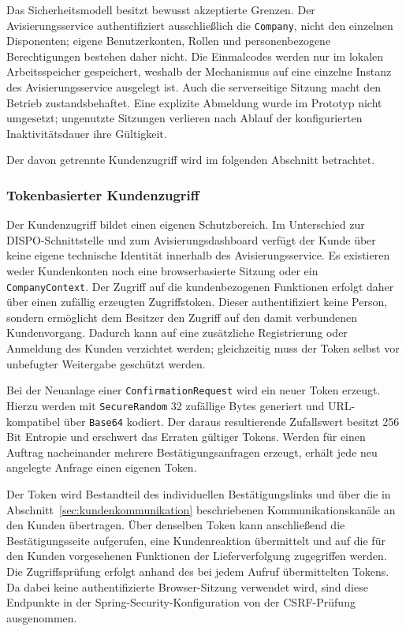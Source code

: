 Das Sicherheitsmodell besitzt bewusst akzeptierte Grenzen. Der
Avisierungsservice authentifiziert ausschließlich die \texttt{Company}, nicht
den einzelnen Disponenten; eigene Benutzerkonten, Rollen und personenbezogene
Berechtigungen bestehen daher nicht. Die Einmalcodes werden nur im lokalen
Arbeitsspeicher gespeichert, weshalb der Mechanismus auf eine einzelne Instanz
des Avisierungsservice ausgelegt ist. Auch die serverseitige Sitzung macht den
Betrieb zustandsbehaftet. Eine explizite Abmeldung wurde im Prototyp nicht
umgesetzt; ungenutzte Sitzungen verlieren nach Ablauf der konfigurierten
Inaktivitätsdauer ihre Gültigkeit.

Der davon getrennte Kundenzugriff wird im folgenden Abschnitt betrachtet.

\subsubsection{Tokenbasierter Kundenzugriff}
\label{sec:kundenzugriff-token}

Der Kundenzugriff bildet einen eigenen Schutzbereich. Im Unterschied zur
DISPO-Schnittstelle und zum Avisierungsdashboard verfügt der Kunde über keine
eigene technische Identität innerhalb des Avisierungsservice. Es existieren
weder Kundenkonten noch eine browserbasierte
Sitzung oder ein \texttt{CompanyContext}. Der Zugriff auf die kundenbezogenen
Funktionen erfolgt daher über einen zufällig erzeugten Zugriffstoken. Dieser
authentifiziert keine Person, sondern ermöglicht dem Besitzer den Zugriff auf
den damit verbundenen Kundenvorgang. Dadurch kann auf eine zusätzliche
Registrierung oder Anmeldung des Kunden verzichtet werden; gleichzeitig muss
der Token selbst vor unbefugter Weitergabe geschützt werden.

Bei der Neuanlage einer \texttt{ConfirmationRequest} wird ein neuer Token
erzeugt. Hierzu werden mit \texttt{SecureRandom} 32 zufällige Bytes generiert
und URL-kompatibel über \texttt{Base64} kodiert. Der daraus resultierende
Zufallswert besitzt 256 Bit Entropie und erschwert das Erraten gültiger Tokens.
Werden für einen Auftrag nacheinander mehrere Bestätigungsanfragen erzeugt,
erhält jede neu angelegte Anfrage einen eigenen Token.

Der Token wird Bestandteil des individuellen Bestätigungslinks und über die in
Abschnitt~\ref{sec:kundenkommunikation} beschriebenen Kommunikationskanäle an
den Kunden übertragen. Über denselben Token kann anschließend die
Bestätigungsseite aufgerufen, eine Kundenreaktion übermittelt und auf die für den
Kunden vorgesehenen Funktionen der Lieferverfolgung zugegriffen werden. Die
Zugriffsprüfung erfolgt
anhand des bei jedem Aufruf übermittelten Tokens. Da dabei keine authentifizierte
Browser-Sitzung verwendet wird, sind diese Endpunkte in der
Spring-Security-Konfiguration von der CSRF-Prüfung ausgenommen.

